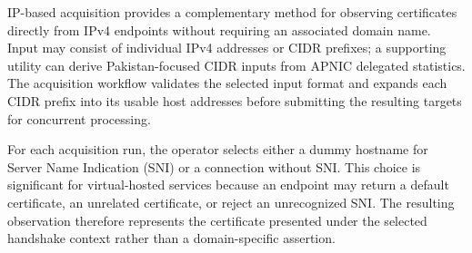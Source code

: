 IP-based acquisition provides a complementary method for observing
certificates directly from IPv4 endpoints without requiring an associated
domain name. Input may consist of individual IPv4 addresses or CIDR prefixes;
a supporting utility can derive Pakistan-focused CIDR inputs from APNIC
delegated statistics. The acquisition workflow validates the selected input
format and expands each CIDR prefix into its usable host addresses before
submitting the resulting targets for concurrent processing.

For each acquisition run, the operator selects either a dummy hostname for
Server Name Indication (SNI) or a connection without SNI. This choice is
significant for virtual-hosted services because an endpoint may return a
default certificate, an unrelated certificate, or reject an unrecognized SNI.
The resulting observation therefore represents the certificate presented
under the selected handshake context rather than a domain-specific assertion.

